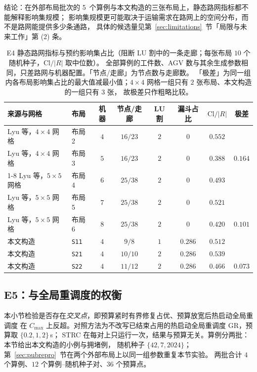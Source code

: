 \documentclass[manuscript,screen,review]{acmart}
\providecommand{\STRC}{\textsc{STRC}}
\newcommand{\NSeeds}{10}
\newcommand{\EfiveInst}{4}          %
\newcommand{\EfiveCells}{12}        %
\newcommand{\EfivePts}{36}          %
\newcommand{\NPubInst}{5}
\newcommand{\PubCloSpread}{0.164}
\newcommand{\PubCloSpreadBig}{0.101}
\newcommand{\SelfCloSpread}{0.073}
\begin{document}
结论：在外部布局批次的 \NPubInst\ 个算例与本文构造的三张布局上，静态路网指标都不能解释影响集规模；
影响集规模更可能取决于运输需求在路网上的空间分布，而不是路网能提供多少条通路，
具体的候选量见第~\ref{sec:limitations}~节「局限与未来工作」第 (2) 条。

\begin{table}[t]
\centering
\caption{E4 静态路网指标与预约影响集占比（阻断 LU 割中的一条走廊；每张布局 \(\NSeeds\) 个随机种子，\(\mathrm{Cl}/|R|\) 取中位数）。
全部算例的工件数、AGV 数与其余生成参数相同，只差路网与机器配置。「节点/走廊」为节点数与走廊数。
「极差」为同一组内各布局影响集占比的最大值减最小值；\(4\times 4\) 网格一组只有 \(2\) 张布局、本文构造的一组只有 \(3\) 张，
故极差只作粗略比较。}
\label{tab:e4pub}
\small
\begin{tabular}{@{}llcccccc@{}}
\toprule
来源与网格 & 布局 & 机器 & 节点/走廊 & LU 割 & 漏斗占比 & \(\mathrm{Cl}/|R|\)
 & 极差 \\
\midrule
Lyu 等，\(4\times 4\) 网格 & 布局 2 & \(4\) & \(16/23\) & \(2\) & \(0\) & \(0.552\) & \\
Lyu 等，\(4\times 4\) 网格 & 布局 3 & \(5\) & \(16/23\) & \(2\) & \(0\) & \(0.388\)
  & \(\PubCloSpread\) \\
\cmidrule{1-8}
Lyu 等，\(5\times 5\) 网格 & 布局 4 & \(6\) & \(25/38\) & \(2\) & \(0\) & \(0.493\) & \\
Lyu 等，\(5\times 5\) 网格 & 布局 5 & \(7\) & \(25/38\) & \(2\) & \(0\) & \(0.521\) & \\
Lyu 等，\(5\times 5\) 网格 & 布局 6 & \(8\) & \(25/38\) & \(2\) & \(0\) & \(0.420\)
  & \(\PubCloSpreadBig\) \\
\midrule
本文构造 & \texttt{S11} & \(4\) & \(9/8\) & \(1\) & \(0.286\) & \(0.512\) & \\
本文构造 & \texttt{S21} & \(4\) & \(10/10\) & \(2\) & \(0.286\) & \(0.539\) & \\
本文构造 & \texttt{S22} & \(4\) & \(11/12\) & \(2\) & \(0.286\) & \(0.466\)
  & \(\SelfCloSpread\) \\
\bottomrule
\end{tabular}
\end{table}

\subsection{E5：与全局重调度的权衡}
\label{sec:e5}

本小节检验是否存在\emph{交叉点}，即预算紧时有界修复占优、预算放宽后热启动全局重调度
在 \(C_{\max}\) 上反超。对照方法为不改写已结束占用的热启动全局重调度 GR，预算取 \(\{0.2,1,2\}\)\,s；
\STRC{} 在每对上只运行一次，结果与预算无关。算例分两批：本节给出本文构造的小例与拥堵例，
随机种子 \(\{42,7,2024\}\)；第~\ref{sec:pubrepro}~节在两个外部布局上以同一组参数重复本节实验。
两批合计 \(\EfiveInst\) 个算例、\(\EfiveCells\) 个算例--随机种子对、\(\EfivePts\) 个预算点。
\end{document}
